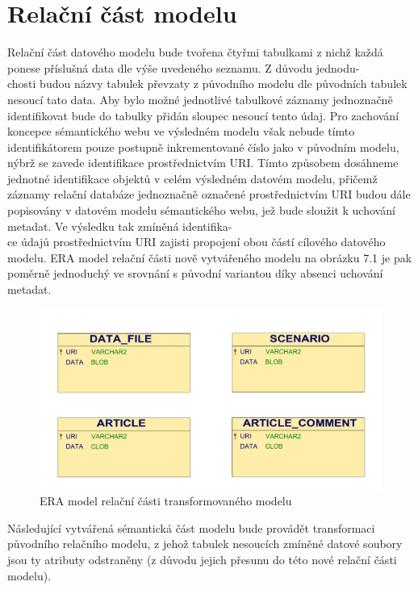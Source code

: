 \documentclass{projekt}
\begin{document}
\section{Relační část modelu}
\hspace{0.65cm}Relační část datového modelu bude tvořena čtyřmi tabulkami z nichž každá ponese příslušná data dle výše uvedeného seznamu. Z důvodu jednodu-\\chosti budou názvy tabulek převzaty z původního modelu dle původních tabulek nesoucí tato data. Aby bylo možné jednotlivé tabulkové záznamy jednoznačně identifikovat bude do tabulky přidán sloupec nesoucí tento údaj. Pro zachování  koncepce sémantického webu ve výsledném modelu však nebude tímto identifikátorem pouze postupně inkrementované číslo jako v původním modelu, nýbrž se zavede identifikace prostřednictvím URI. Tímto způsobem dosáhneme jednotné identifikace objektů v celém výsledném datovém modelu, přičemž záznamy relační databáze jednoznačně označené prostřednictvím URI budou dále popisovány v datovém modelu sémantického webu, jež bude sloužit k uchování metadat. Ve výsledku tak zmíněná identifika-\\ce údajů prostřednictvím URI zajisti propojení obou částí cílového datového modelu. ERA model relační části nově vytvářeného modelu na obrázku 7.1 je pak poměrně jednoduchý ve srovnání s původní variantou díky absenci uchování metadat. 

\begin{figure}[htb]
\begin{center}
\includegraphics[scale=0.35]{eraNovej.pdf}
\caption{ERA model relační části transformovaného modelu}
\end{center}
\end{figure}


Následující vytvářená sémantická část modelu bude provádět transformaci původního relačního modelu, z jehož tabulek nesoucích zmíněné datové soubory jsou ty atributy odstraněny (z důvodu jejich přesunu do této nové relační části modelu).
\end{document}
